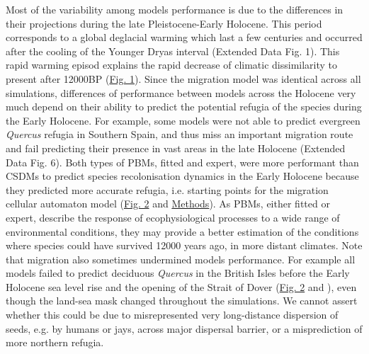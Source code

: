 \documentclass[pdflatex, sn-nature]{sn-jnl}%
\begin{document}
\begin{itemize}

Most of the variability among models performance is due to the differences in their projections during the late Pleistocene-Early Holocene. This period  corresponds to a global deglacial warming which last a few centuries and occurred after the cooling of the Younger Dryas interval  (Extended Data Fig. 1). This rapid warming episod explains the rapid decrease of climatic dissimilarity to present after 12000BP (\hyperref[climatic_dissimilarity]{Fig. 1}). Since the migration model was identical across all simulations, differences of performance between models across the Holocene very much depend on their ability to predict the potential refugia of the species during the Early Holocene. For example, some models were not able to predict evergreen \emph{Quercus} refugia in Southern Spain, and thus miss an important migration route and fail predicting their presence in vast areas in the late Holocene (Extended Data Fig. 6). Both types of PBMs, fitted and expert, were more performant than CSDMs to predict species recolonisation dynamics in the Early Holocene because they predicted more accurate refugia, i.e. starting points for the migration cellular automaton model (\hyperref[quercus_migration]{Fig. 2} and \hyperref[methods]{Methods}). As PBMs, either fitted or expert, describe the response of ecophysiological processes to a wide range of environmental conditions, they may provide a better estimation of the conditions where species could have survived 12000 years ago, in more distant climates. Note that migration also sometimes undermined models performance. For example all models failed to predict deciduous \emph{Quercus} in the British Isles before the Early Holocene sea level rise and the opening of the Strait of Dover (\hyperref[quercus_migration]{Fig. 2} and \cite{Smith2011}), even though the land-sea mask changed throughout the simulations. We cannot assert whether this could be due to misrepresented very long-distance dispersion of seeds, e.g. by humans or jays, across major dispersal barrier, or a misprediction of more northern refugia.



\end{itemize}
\end{document}
